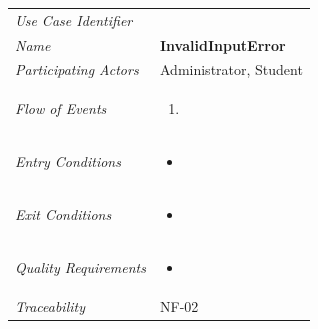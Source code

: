 \documentclass[12pt,letterpaper]{article}
\begin{document}
\begin{center}
	\begin{tabu} to 
		\toprule
		Use Case Identifier & \invalidinputerror{} \\
		Name & {\bf InvalidInputError} \\
		Participating Actors & Administrator, Student \\
		Flow of Events & 
	    \begin{enumerate}[topsep=-1em,leftmargin=*]
		    \item 
		\end{enumerate} \\

		Entry Conditions &
		\begin{itemize}[topsep=-1em,leftmargin=*]
		    \item 
        \end{itemize} \\

		Exit Conditions &
		\begin{itemize}[topsep=-1em,leftmargin=*]
		    \item 
        \end{itemize} \\

		Quality Requirements &
		\begin{itemize}[topsep=-1em,leftmargin=*]
		    \item 
        \end{itemize} \\

		Traceability & NF-02 \\
		\toprule
	\end{tabu}
\end{center}
\end{document}
